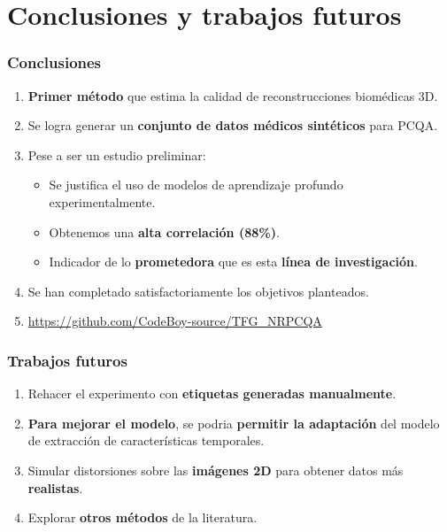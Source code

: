 \section{Conclusiones y trabajos futuros}
\begin{frame}
  \frametitle{Conclusiones}
  \begin{enumerate}
    \item \textbf{Primer método} que estima la calidad de reconstrucciones biomédicas 3D.
    \item Se logra generar un \textbf{conjunto de datos médicos sintéticos } para PCQA.
    \item Pese a ser un estudio preliminar: 
      \begin{itemize}
        \item Se justifica el uso de modelos de aprendizaje profundo experimentalmente.
        \item Obtenemos una \textbf{alta correlación (88\%)}. 
        \item Indicador de lo \textbf{prometedora} que es esta \textbf{línea de investigación}.
      \end{itemize}
    \item Se han completado satisfactoriamente los objetivos planteados.
    \item \url{https://github.com/CodeBoy-source/TFG_NRPCQA} 
  \end{enumerate}
\end{frame}

\begin{frame}
  \frametitle{Trabajos futuros}
  \begin{enumerate}
    \item Rehacer el experimento con \textbf{etiquetas generadas manualmente}. 
    \item \textbf{Para mejorar el modelo}, se podria \textbf{permitir la adaptación} del modelo de extracción de características temporales.
    \item Simular distorsiones sobre las \textbf{imágenes 2D} para obtener datos más \textbf{realistas}.
    \item Explorar \textbf{otros métodos} de la literatura. 
  \end{enumerate}
\end{frame}
